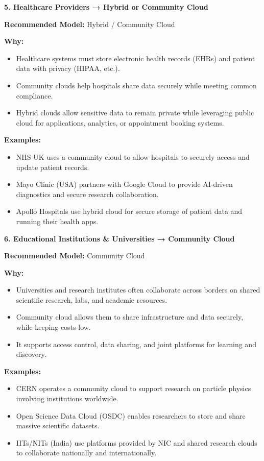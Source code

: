 \documentclass[12pt]{article}
\begin{document}
\textbf{5. Healthcare Providers → Hybrid or Community Cloud}

\textbf{Recommended Model:} Hybrid / Community Cloud

\textbf{Why:}

\begin{itemize}
\item
  Healthcare systems must store electronic health records (EHRs) and
  patient data with privacy (HIPAA, etc.).
\item
  Community clouds help hospitals share data securely while meeting
  common compliance.
\item
  Hybrid clouds allow sensitive data to remain private while leveraging
  public cloud for applications, analytics, or appointment booking
  systems.
\end{itemize}

\textbf{Examples:}

\begin{itemize}
\item
  NHS UK uses a community cloud to allow hospitals to securely access
  and update patient records.
\item
  Mayo Clinic (USA) partners with Google Cloud to provide AI-driven
  diagnostics and secure research collaboration.
\item
  Apollo Hospitals use hybrid cloud for secure storage of patient data
  and running their health apps.
\end{itemize}

\textbf{6. Educational Institutions \& Universities → Community Cloud}

\textbf{Recommended Model:} Community Cloud

\textbf{Why:}

\begin{itemize}
\item
  Universities and research institutes often collaborate across borders
  on shared scientific research, labs, and academic resources.
\item
  Community cloud allows them to share infrastructure and data securely,
  while keeping costs low.
\item
  It supports access control, data sharing, and joint platforms for
  learning and discovery.
\end{itemize}

\textbf{Examples:}

\begin{itemize}
\item
  CERN operates a community cloud to support research on particle
  physics involving institutions worldwide.
\item
  Open Science Data Cloud (OSDC) enables researchers to store and share
  massive scientific datasets.
\item
  IITs/NITs (India) use platforms provided by NIC and shared research
  clouds to collaborate nationally and internationally.
\end{itemize}
\end{document}
